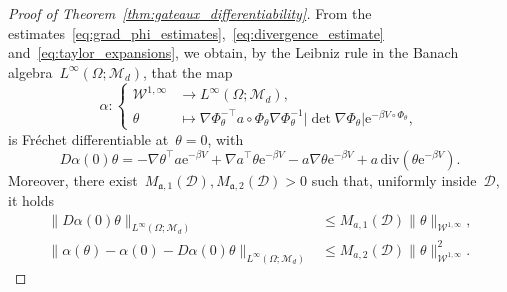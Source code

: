 \documentclass[a4]{article}
\newcommand{\e}{\mathrm{e}}
\renewcommand{\div}{\mathrm{div}}
\newcommand{\fa}{\mathfrak{a}}
\newcommand{\1}{\mathbbm 1}
\newcommand{\Winf}{{{\cW}^{1,\infty}}}
\newcommand{\cW}{\mathcal{W}}
\begin{document}
\begin{proof}[Proof of Theorem~\ref{thm:gateaux_differentiability}]
    From the estimates~\eqref{eq:grad_phi_estimates},~\eqref{eq:divergence_estimate} and~\eqref{eq:taylor_expansions}, we obtain, by the Leibniz rule in the Banach algebra~$L^\infty(\Omega;\mathcal M_d)$, that the map
    \begin{equation}
        \label{eq:matrix_expr}
        \alpha:\left\{\begin{aligned}
            \Winf&\rightarrow  L^\infty(\Omega;\mathcal M_d),\\
            \theta & \mapsto\nabla \Phi_\theta^{-\top} a\circ \Phi_\theta \nabla \Phi_\theta^{-1}|\det \nabla \Phi_\theta| \e^{-\beta V\circ \Phi_\theta},
        \end{aligned}\right.
    \end{equation}
    is Fréchet differentiable at~$\theta = 0$, with
    \begin{equation}
        D\alpha(0)\theta = -\nabla\theta^\top a \e^{-\beta V} + \nabla a^\top\theta \e^{-\beta V} -a\nabla\theta\e^{-\beta V} + a\,\div\left(\theta\e^{-\beta V}\right).
    \end{equation}
    Moreover, there exist~$M_{\fa,1}(\mathcal D),M_{\fa,2}(\mathcal D)>0$ such that, uniformly inside~$\mathcal D$, it holds
    \begin{equation}
        \label{eq:dalpha_estimates}
        \begin{aligned}
            \|D\alpha(0)\theta\|_{L^\infty(\Omega;\mathcal M_d)} &\leq M_{a,1}(\mathcal D)\|\theta\|_{\Winf},\\
            \|\alpha(\theta)- \alpha(0)-D\alpha(0)\theta\|_{L^\infty(\Omega;\mathcal M_d)} & \leq M_{a,2}(\mathcal D)\|\theta\|_{\Winf}^2.
        \end{aligned}
    \end{equation}


\end{proof}
\end{document}
